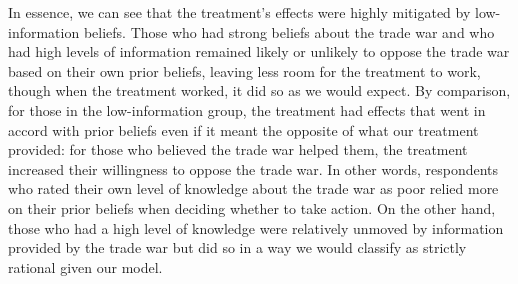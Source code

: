 \documentclass{article}
\begin{document}



In essence, we can see that the treatment's effects were highly mitigated by low-information beliefs. Those who had strong beliefs about the trade war and who had high levels of information remained likely or unlikely to oppose the trade war based on their own prior beliefs, leaving less room for the treatment to work, though when the treatment worked, it did so as we would expect. By comparison, for those in the low-information group, the treatment had effects that went in accord with prior beliefs even if it meant the opposite of what our treatment provided: for those who believed the trade war helped them, the treatment increased their willingness to oppose the trade war. In other words, respondents who rated their own level of knowledge about the trade war as poor relied more on their prior beliefs when deciding whether to take action. On the other hand, those who had a high level of knowledge were relatively unmoved by information provided by the trade war but did so in a way we would classify as strictly rational given our model. 
\end{document}
